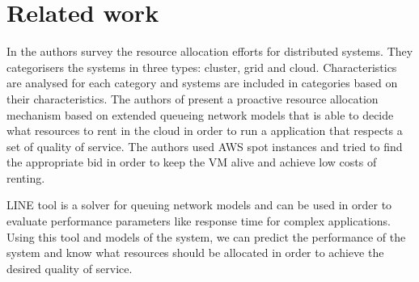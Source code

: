 \section{Related work}
\label{sec:relatesWork}

In \cite{Hussain2013} the authors survey the resource allocation efforts for distributed systems. They categorisers the systems in three types: cluster, grid and cloud. Characteristics are analysed for each category and systems are included in categories based on their characteristics. The authors of \cite{Dubois} present a proactive resource allocation mechanism based on extended queueing network models that is able to decide what resources to rent in the cloud in order to run a application that respects a set of quality of service. The authors used AWS spot instances and tried to find the appropriate bid in order to keep the VM alive and achieve low costs of renting.

LINE \cite{Perez2013} tool is a solver for queuing network models and can be used in order to evaluate performance parameters like response time for complex applications. Using this tool and models of the system, we can predict the performance of the system and know what resources should be allocated in order to achieve the desired quality of service.